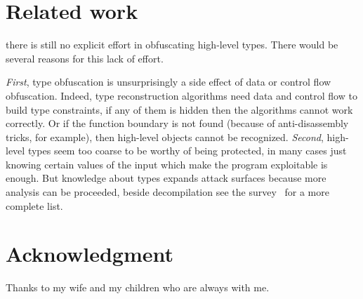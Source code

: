 \documentclass[compsoc,conference,a4paper,10pt,times]{IEEEtran}
\begin{document}
\section{Related work}\label{sec:relatedwork}
\noindent
there is still no explicit effort in obfuscating
high-level types. There would be several reasons for this lack of effort.

\emph{First}, type obfuscation is unsurprisingly a side effect of data or control flow obfuscation.
Indeed, type reconstruction algorithms need data and control flow to build type constraints,
if any of them is hidden
then the algorithms cannot work correctly. Or if the function boundary is not found
(because of anti-disassembly tricks, for example), then high-level objects cannot be recognized.
\emph{Second}, high-level types seem too coarse to be worthy
of being protected, in many cases just knowing certain values of the input which make the program
exploitable is enough. But knowledge about types expands attack surfaces because more analysis
can be proceeded, beside decompilation see the survey~\cite{caballero_type_2016} for a
more complete list.

\section*{Acknowledgment}
\noindent
Thanks to my wife and my children who are always with me.


\end{document}

